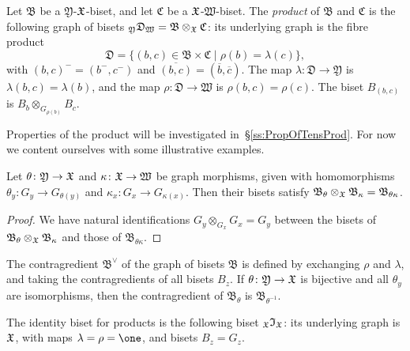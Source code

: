 \documentclass{amsart}
\begin{document}
\begin{defn}
  Let $\mathfrak B$ be a $\mathfrak Y$-${\mathfrak X}$-biset, and let $\mathfrak C$
  be a ${\mathfrak X}$-$\mathfrak W$-biset. The \emph{product} of $\mathfrak B$ and
  $\mathfrak C$ is the following graph of bisets ${}_{\mathfrak Y}\mathfrak
  D_{\mathfrak W}=\mathfrak B\otimes_{\mathfrak X}\mathfrak C$: its underlying graph
  is the fibre product
  \[\mathfrak D=\{(b,c)\in\mathfrak B\times\mathfrak C\mid \rho(b)=\lambda(c)\},
  \]
  with $(b,c)^-=(b^-,c^-)$ and $\overline{(b,c)}=(\overline
  b,\overline c)$. The map $\lambda\colon\mathfrak D\to\mathfrak Y$ is
  $\lambda(b,c)=\lambda(b)$, and the map $\rho\colon\mathfrak D\to\mathfrak
  W$ is $\rho(b,c)=\rho(c)$. The biset $B_{(b,c)}$ is
  $B_b\otimes_{G_{\rho(b)}}B_c$.
\end{defn}

\noindent Properties of the product will be investigated
in~\S\ref{ss:PropOfTensProd}. For now we content ourselves with some
illustrative examples.

\begin{lem}[See Example~\ref{ex:map=biset}]
  Let $\theta\colon\mathfrak Y\to{\mathfrak X}$ and $\kappa\colon{\mathfrak X}\to\mathfrak W$ be
  graph morphisms, given with homomorphisms $\theta_y\colon G_y\to
  G_{\theta(y)}$ and $\kappa_x\colon G_x\to G_{\kappa(x)}$. Then their
  bisets satisfy $\mathfrak B_\theta\otimes_{\mathfrak X} \mathfrak
  B_\kappa=\mathfrak B_{\theta\kappa}$.
\end{lem}
\begin{proof}
  We have natural identifications $G_y\otimes_{G_x}G_x=G_y$ between
  the bisets of $\mathfrak B_\theta\otimes_{\mathfrak X} \mathfrak B_\kappa$ and
  those of $\mathfrak B_{\theta\kappa}$.
\end{proof}

The contragredient $\mathfrak B^\vee$ of the graph of bisets
$\mathfrak B$ is defined by exchanging $\rho$ and $\lambda$, and
taking the contragredients of all bisets $B_z$. If $\theta\colon\mathfrak
Y\to{\mathfrak X}$ is bijective and all $\theta_y$ are isomorphisms, then the
contragredient of $\mathfrak B_\theta$ is $\mathfrak B_{\theta^{-1}}$.

The identity biset for products is the following biset
${}_{\mathfrak X}\mathfrak I_{\mathfrak X}$: its underlying graph is ${\mathfrak X}$, with maps
$\lambda=\rho=\one$, and bisets $B_z=G_z$.
\end{document}
